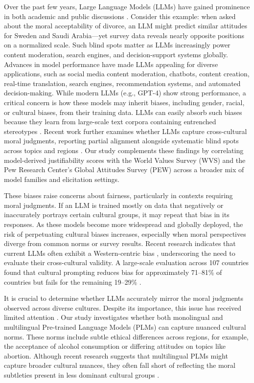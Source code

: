 \documentclass[a4paper,10pt,twoside]{article}
\begin{document}
Over the past few years, Large Language Models (LLMs) have gained prominence in both academic and public discussions \cite{Bender2021}. Consider this example: when asked about the moral acceptability of divorce, an LLM might predict similar attitudes for Sweden and Saudi Arabia---yet survey data reveals nearly opposite positions on a normalized scale. Such blind spots matter as LLMs increasingly power content moderation, search engines, and decision-support systems globally. Advances in model performance have made LLMs appealing for diverse applications, such as social media content moderation, chatbots, content creation, real-time translation, search engines, recommendation systems, and automated decision-making. While modern LLMs (e.g., GPT-4) show strong performance, a critical concern is how these models may inherit biases, including gender, racial, or cultural biases, from their training data. LLMs can easily absorb such biases because they learn from large-scale text corpora containing entrenched stereotypes \cite{Stanczak2021,Karpouzis2024}. Recent work further examines whether LLMs capture cross-cultural moral judgments, reporting partial alignment alongside systematic blind spots across topics and regions \cite{mohammadi2025morality}. Our study complements these findings by correlating model-derived justifiability scores with the World Values Survey (WVS) and the Pew Research Center's Global Attitudes Survey (PEW) across a broader mix of model families and elicitation settings.

These biases raise concerns about fairness, particularly in contexts requiring moral judgments. If an LLM is trained mostly on data that negatively or inaccurately portrays certain cultural groups, it may repeat that bias in its responses. As these models become more widespread and globally deployed, the risk of perpetuating cultural biases increases, especially when moral perspectives diverge from common norms or survey results. Recent research indicates that current LLMs often exhibit a Western-centric bias \cite{adilazuarda2024towards}, underscoring the need to evaluate their cross-cultural validity. A large-scale evaluation across 107 countries found that cultural prompting reduces bias for approximately 71--81\% of countries but fails for the remaining 19--29\% \cite{tao2024cultural}.

It is crucial to determine whether LLMs accurately mirror the moral judgments observed across diverse cultures. Despite its importance, this issue has received limited attention \cite{arora2023probing,liu2024multilingual}. Our study investigates whether both monolingual and multilingual Pre-trained Language Models (PLMs) can capture nuanced cultural norms. These norms include subtle ethical differences across regions, for example, the acceptance of alcohol consumption or differing attitudes on topics like abortion. Although recent research suggests that multilingual PLMs might capture broader cultural nuances, they often fall short of reflecting the moral subtleties present in less dominant cultural groups \cite{Hammerl2022,papadopoulou2024}.
\end{document}
